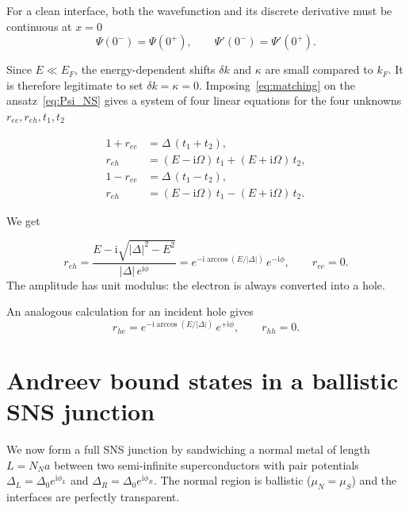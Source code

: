\documentclass[11pt,a4paper,twoside,openany]{report}
\begin{document}
For a clean interface, both the wavefunction and its discrete derivative must be continuous at $x=0$
\begin{equation}
  \Psi(0^-) = \Psi(0^+), \qquad
  \Psi'(0^-) = \Psi'(0^+).
  \label{eq:matching}
\end{equation}

Since $E\ll E_F$, the energy-dependent shifts $\delta k$ and $\kappa$ are small compared to $k_F$.  It is therefore legitimate to set $\delta k = \kappa = 0$. Imposing~\eqref{eq:matching} on the ansatz~\eqref{eq:Psi_NS} gives a system of four linear equations for the four unknowns $r_{ee}, r_{eh}, t_1, t_2$


\begin{equation}
  \boxed{
  \begin{aligned}
    1 + r_{ee} &= \Delta\,(t_1 + t_2), \\
    r_{eh}      &= (E - \mathrm{i}\Omega)\,t_1 + (E + \mathrm{i}\Omega)\,t_2, \\
    1 - r_{ee}  &= \Delta\,(t_1 - t_2), \\
    r_{eh}      &= (E - \mathrm{i}\Omega)\,t_1 - (E + \mathrm{i}\Omega)\,t_2 .
  \end{aligned}}
  \label{eq:matching_eqs}
\end{equation}

We get

\begin{equation}
  \boxed{
  r_{eh} =\frac{E - \mathrm{i}\sqrt{|\Delta|^2 - E^2}}{|\Delta|\,e^{\mathrm{i}\phi}}= e^{-\mathrm{i}\arccos(E/|\Delta|)}\, e^{-\mathrm{i}\phi}, \qquad r_{ee} = 0.
  }
  \label{eq:Andreev_amplitude}
\end{equation}
The amplitude has unit modulus: the electron is always converted into a hole.

An analogous calculation for an incident hole gives
\begin{equation}
  \boxed{
  r_{he} = e^{-\mathrm{i}\arccos(E/|\Delta|)}\, e^{+\mathrm{i}\phi}, \qquad r_{hh} = 0.
  }
  \label{eq:Andreev_amplitude_hole}
\end{equation}



\section{Andreev bound states in a ballistic SNS junction}

We now form a full SNS junction by sandwiching a normal metal of length $L = N_N a$ between two semi-infinite superconductors with pair potentials $\Delta_L = \Delta_0 e^{\mathrm{i}\phi_L}$ and $\Delta_R = \Delta_0 e^{\mathrm{i}\phi_R}$.  The normal region is ballistic ($\mu_N = \mu_S$) and the interfaces are perfectly transparent.
\end{document}
